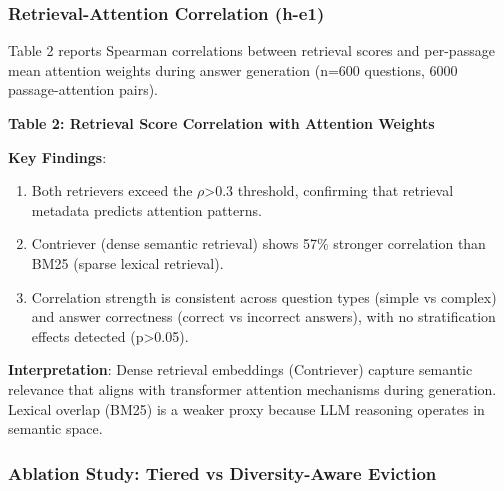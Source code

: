 \subsubsection{Retrieval-Attention Correlation (h-e1)}

Table 2 reports Spearman correlations between retrieval scores and per-passage mean attention weights during answer generation (n=600 questions, 6000 passage-attention pairs).

\textbf{Table 2: Retrieval Score Correlation with Attention Weights}

\begin{table}[htbp]
\centering
{}
\end{table}

\textbf{Key Findings}:

\begin{enumerate}
\item Both retrievers exceed the $\rho$>0.3 threshold, confirming that retrieval metadata predicts attention patterns.
\item Contriever (dense semantic retrieval) shows 57\% stronger correlation than BM25 (sparse lexical retrieval).
\item Correlation strength is consistent across question types (simple vs complex) and answer correctness (correct vs incorrect answers), with no stratification effects detected (p>0.05).
\end{enumerate}

\textbf{Interpretation}: Dense retrieval embeddings (Contriever) capture semantic relevance that aligns with transformer attention mechanisms during generation. Lexical overlap (BM25) is a weaker proxy because LLM reasoning operates in semantic space.

\subsubsection{Ablation Study: Tiered vs Diversity-Aware Eviction}

